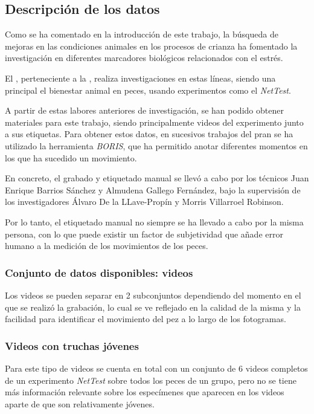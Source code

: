 \subsection{Descripción de los datos}

Como se ha comentado en la introducción de este trabajo, la búsqueda de mejoras en las condiciones animales en los procesos de crianza ha fomentado la investigación en 
diferentes marcadores biológicos relacionados con el estrés.

El \cite{ObservatorioUPM}, perteneciente a la , realiza investigaciones en estas líneas, siendo una principal el bienestar animal en peces, 
usando experimentos como el \textit{NetTest}.

A partir de estas labores anteriores de investigación, se han podido obtener materiales para este trabajo, siendo principalmente videos del experimento junto a sus etiquetas. Para obtener 
estos datos, en sucesivos trabajos del \acrshort{pran} se ha utilizado la herramienta \textit{BORIS}\cite{friardBORISFreeVersatile2016}, que ha permitido anotar diferentes momentos en los que 
ha sucedido un movimiento.

En concreto, el grabado y etiquetado manual se llevó a cabo por los técnicos Juan Enrique Barrios Sánchez\cite{barriossanchezPruebaRedEvaluando2023}  y Almudena Gallego Fernández, bajo la supervisión de los investigadores 
Álvaro De la LLave-Propín y Morris Villarroel Robinson.

Por lo tanto, el etiquetado manual no siempre se ha llevado a cabo por la misma persona, con lo que puede existir un factor de subjetividad que añade error humano a la medición de los 
movimientos de los peces.

\subsubsection{Conjunto de datos disponibles: videos}

Los videos se pueden separar en 2 subconjuntos dependiendo del momento en el que se realizó la grabación, lo cual se ve reflejado en la calidad de la misma y la facilidad para identificar el movimiento 
del pez a lo largo de los fotogramas.

\subsubsection*{Videos con truchas jóvenes}

Para este tipo de videos se cuenta en total con un conjunto de 6 videos completos de un experimento \textit{NetTest} sobre todos los peces de un grupo, pero no se tiene más información relevante sobre 
los especímenes que aparecen en los videos aparte de que son relativamente jóvenes.

